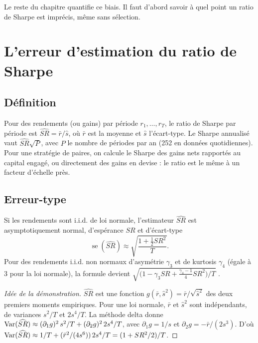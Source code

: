 Le reste du chapitre quantifie ce biais. Il faut d'abord savoir à quel point un ratio de Sharpe est imprécis, même sans sélection.

\section{L'erreur d'estimation du ratio de Sharpe}

\subsection{Définition}

Pour des rendements (ou gains) par période $r_1,\dots,r_T$, le ratio de Sharpe par période est $\widehat{SR} = \bar r/\hat s$, où $\bar r$ est la moyenne et $\hat s$ l'écart-type. Le Sharpe annualisé vaut $\widehat{SR}\sqrt{P}$, avec $P$ le nombre de périodes par an (252 en données quotidiennes). Pour une stratégie de paires, on calcule le Sharpe des gains nets rapportés au capital engagé, ou directement des gains en devise : le ratio est le même à un facteur d'échelle près.

\subsection{Erreur-type}

\begin{proposition}[\citet{lo2002}]\label{c16:prop:sese}
Si les rendements sont i.i.d. de loi normale, l'estimateur $\widehat{SR}$ est asymptotiquement normal, d'espérance $SR$ et d'écart-type
\[
\operatorname{se}(\widehat{SR}) \approx \sqrt{\frac{1 + \frac12 SR^2}{T}}.
\]
Pour des rendements i.i.d. non normaux d'asymétrie $\gamma_3$ et de kurtosis $\gamma_4$ (égale à 3 pour la loi normale), la formule devient $\sqrt{\big(1 - \gamma_3 SR + \frac{\gamma_4-1}{4}SR^2\big)/T}$ \citep{bailey2014dsr}.
\end{proposition}
\begin{proof}[Idée de la démonstration]
$\widehat{SR}$ est une fonction $g(\bar r, \hat s^2) = \bar r/\sqrt{\hat s^2}$ des deux premiers moments empiriques. Pour une loi normale, $\bar r$ et $\hat s^2$ sont indépendants, de variances $s^2/T$ et $2s^4/T$. La méthode delta donne $\operatorname{Var}(\widehat{SR}) \approx (\partial_1 g)^2\,s^2/T + (\partial_2 g)^2\,2s^4/T$, avec $\partial_1 g = 1/s$ et $\partial_2 g = -\bar r/(2s^3)$. D'où $\operatorname{Var}(\widehat{SR}) \approx 1/T + (\bar r^2/(4s^6))\,2s^4/T = (1 + SR^2/2)/T$.
\end{proof}

